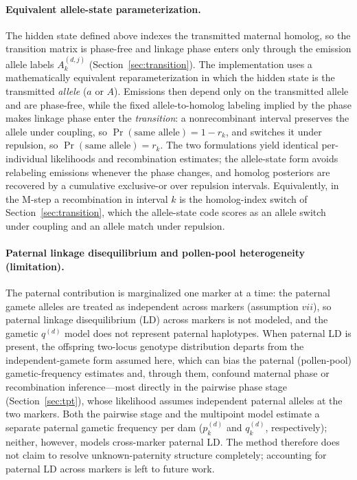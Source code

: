 \documentclass[11pt]{article}
\begin{document}
\paragraph{Equivalent allele-state parameterization.} The hidden state defined above indexes the transmitted maternal homolog, so the transition matrix is phase-free and linkage phase enters only through the emission allele labels $A_k^{(d,j)}$ (Section~\ref{sec:transition}). The implementation uses a mathematically equivalent reparameterization in which the hidden state is the transmitted \emph{allele} ($a$ or $A$). Emissions then depend only on the transmitted allele and are phase-free, while the fixed allele-to-homolog labeling implied by the phase makes linkage phase enter the \emph{transition}: a nonrecombinant interval preserves the allele under coupling, so $\Pr(\text{same allele})=1-r_k$, and switches it under repulsion, so $\Pr(\text{same allele})=r_k$. The two formulations yield identical per-individual likelihoods and recombination estimates; the allele-state form avoids relabeling emissions whenever the phase changes, and homolog posteriors are recovered by a cumulative exclusive-or over repulsion intervals. Equivalently, in the M-step a recombination in interval $k$ is the homolog-index switch of Section~\ref{sec:transition}, which the allele-state code scores as an allele switch under coupling and an allele match under repulsion.

\paragraph{Paternal linkage disequilibrium and pollen-pool heterogeneity (limitation).} The paternal contribution is marginalized one marker at a time: the paternal gamete alleles are treated as independent across markers (assumption $vii$), so paternal linkage disequilibrium (LD) across markers is not modeled, and the gametic $q^{(d)}$ model does not represent paternal haplotypes. When paternal LD is present, the offspring two-locus genotype distribution departs from the independent-gamete form assumed here, which can bias the paternal (pollen-pool) gametic-frequency estimates and, through them, confound maternal phase or recombination inference---most directly in the pairwise phase stage (Section~\ref{sec:tpt}), whose likelihood assumes independent paternal alleles at the two markers. Both the pairwise stage and the multipoint model estimate a separate paternal gametic frequency per dam ($p_k^{(d)}$ and $q_k^{(d)}$, respectively); neither, however, models cross-marker paternal LD. The method therefore does not claim to resolve unknown-paternity structure completely; accounting for paternal LD across markers is left to future work.
\end{document}
